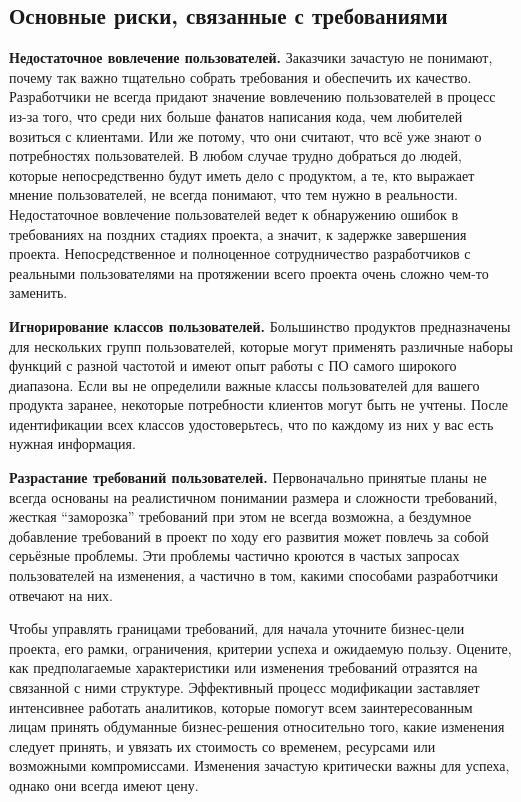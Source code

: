 \documentclass{../../text-style}
\begin{document}
\subsection{Основные риски, связанные с требованиями}

\textbf{Недостаточное вовлечение пользователей.}
Заказчики зачастую не понимают, почему так важно тщательно собрать требования и обеспечить их качество.
Разработчики не всегда придают значение вовлечению пользователей в процесс из-за того, что среди них больше фанатов написания кода, чем любителей возиться с клиентами.
Или же потому, что они считают, что всё уже знают о потребностях пользователей.
В любом случае трудно добраться до людей, которые непосредственно будут иметь дело с продуктом, а те, кто выражает мнение пользователей, не всегда понимают, что тем нужно в реальности.
Недостаточное вовлечение пользователей ведет к обнаружению ошибок в требованиях на поздних стадиях проекта, а значит, к задержке завершения проекта.
Непосредственное и полноценное сотрудничество разработчиков с реальными пользователями на протяжении всего проекта очень сложно чем-то заменить.

\textbf{Игнорирование классов пользователей.}
Большинство продуктов предназначены для нескольких групп пользователей, которые могут применять различные наборы функций с разной частотой и имеют опыт работы с ПО самого широкого диапазона.
Если вы не определили важные классы пользователей для вашего продукта заранее, некоторые потребности клиентов могут быть не учтены.
После идентификации всех классов удостоверьтесь, что по каждому из них у вас есть нужная информация.

\textbf{Разрастание требований пользователей.}
Первоначально принятые планы не всегда основаны на реалистичном понимании размера и сложности требований, жесткая \enquote{заморозка} требований при этом не всегда возможна, а бездумное добавление требований в проект по ходу его развития может повлечь за собой серьёзные проблемы.
Эти проблемы частично кроются в частых запросах пользователей на изменения, а частично в том, какими способами разработчики отвечают на них.

Чтобы управлять границами требований, для начала уточните бизнес-цели проекта, его рамки, ограничения, критерии успеха и ожидаемую пользу.
Оцените, как предполагаемые характеристики или изменения требований отразятся на связанной с ними структуре.
Эффективный процесс модификации заставляет интенсивнее работать аналитиков, которые помогут всем заинтересованным лицам принять обдуманные бизнес-решения относительно того, какие изменения следует принять, и увязать их стоимость со временем, ресурсами или возможными компромиссами.
Изменения зачастую критически важны для успеха, однако они всегда имеют цену.
\end{document}
